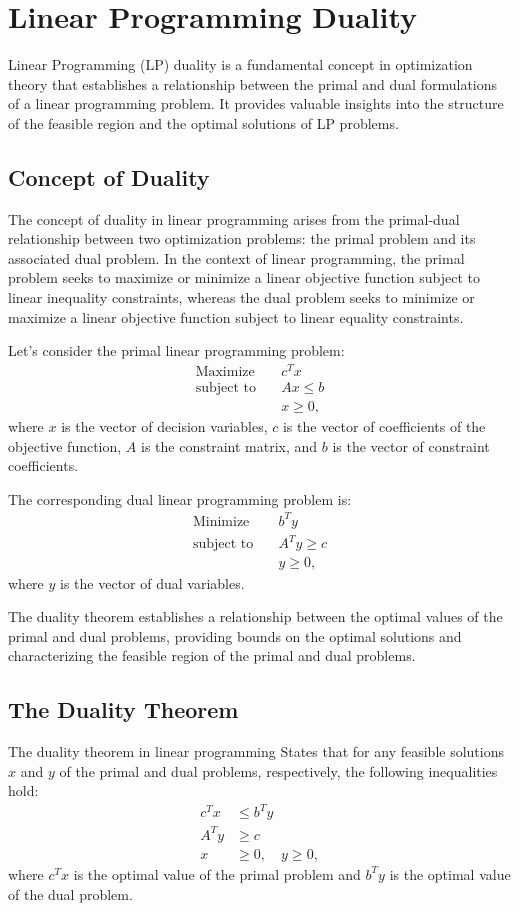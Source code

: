\documentclass[12pt]{book} %
\begin{document}
\section{Linear Programming Duality}
Linear Programming (LP) duality is a fundamental concept in optimization theory that establishes a relationship between the primal and dual formulations of a linear programming problem. It provides valuable insights into the structure of the feasible region and the optimal solutions of LP problems.

\subsection{Concept of Duality}
The concept of duality in linear programming arises from the primal-dual relationship between two optimization problems: the primal problem and its associated dual problem. In the context of linear programming, the primal problem seeks to maximize or minimize a linear objective function subject to linear inequality constraints, whereas the dual problem seeks to minimize or maximize a linear objective function subject to linear equality constraints.

Let's consider the primal linear programming problem:
\begin{align*}
\text{Maximize} \quad & c^T x \\
\text{subject to} \quad & Ax \leq b \\
& x \geq 0,
\end{align*}
where \(x\) is the vector of decision variables, \(c\) is the vector of coefficients of the objective function, \(A\) is the constraint matrix, and \(b\) is the vector of constraint coefficients.

The corresponding dual linear programming problem is:
\begin{align*}
\text{Minimize} \quad & b^T y \\
\text{subject to} \quad & A^T y \geq c \\
& y \geq 0,
\end{align*}
where \(y\) is the vector of dual variables.

The duality theorem establishes a relationship between the optimal values of the primal and dual problems, providing bounds on the optimal solutions and characterizing the feasible region of the primal and dual problems.

\subsection{The Duality Theorem}
The duality theorem in linear programming States that for any feasible solutions \(x\) and \(y\) of the primal and dual problems, respectively, the following inequalities hold:
\begin{align*}
c^T x & \leq b^T y \\
A^T y & \geq c \\
x & \geq 0, \quad y \geq 0,
\end{align*}
where \(c^T x\) is the optimal value of the primal problem and \(b^T y\) is the optimal value of the dual problem.
\end{document}

